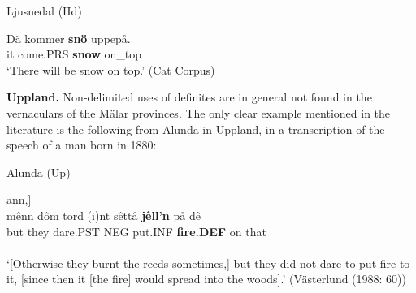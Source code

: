 
\item 

Ljusnedal (Hd)



 \ea\label{}
\gll Dä  kommer  \textbf{snö} uppepå.\\


it  come.PRS  \textbf{snow} on\_top\\

\glt ‘There will be snow on top.’ (Cat Corpus)

\z

\textbf{Uppland. }Non-delimited uses of definites are in general not found in the vernaculars of the Mälar provinces. The only clear example mentioned in the literature is the following from Alunda in Uppland, in a transcription of the speech of a man born in 1880:


\item 

\label{bkm:Ref154222780}Alunda (Up)



 \ea\label{}
\gll [Ann(â)rs sô brênde-råm åpp rörn ib[29F?]ann,] \\

 \ea\label{}
\gll mênn  dôm  tord  (i)nt  sêttâ  \textbf{jêll’n} på  dê  \\


but  they  dare.PST  NEG  put.INF  \textbf{fire.DEF} on   that  \\

 \ea\label{}
\\

\glt ‘[Otherwise they burnt the reeds sometimes,] but they did not dare to put fire to it, [since then it [the fire] would spread into the woods].’ (Västerlund (1988: 60))

